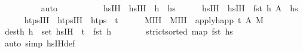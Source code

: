 \begin{isabellebody}
\ \ \ \ \ \ \ \ \isamarkupfalse%
\ auto\isanewline
\ \ \ \ \isamarkupfalse%
\isanewline
\isanewline
\ \ \ \ \isamarkupfalse%
\ hs{\isacharunderscore}{\kern0pt}IH\ \ {\isachardoublequoteopen}hs{\isacharunderscore}{\kern0pt}IH\ {\isasymequiv}\ h{}\ {\isacharhash}{\kern0pt}\ hs{}{\isachardoublequoteclose}\isanewline
\ \ \ \ \isamarkupfalse%
\ hs{\isacharprime}{\kern0pt}{\isacharunderscore}{\kern0pt}IH\ \ {\isachardoublequoteopen}hs{\isacharprime}{\kern0pt}{\isacharunderscore}{\kern0pt}IH\ {\isasymequiv}\ {\isacharparenleft}{\kern0pt}fst\ h{}{\isacharcomma}{\kern0pt}\ A{}{\isacharprime}{\kern0pt}{\isacharparenright}{\kern0pt}\ {\isacharhash}{\kern0pt}\ hs{}{\isacharprime}{\kern0pt}{\isachardoublequoteclose}\isanewline
\ \ \ \ \isamarkupfalse%
\ htps{\isacharunderscore}{\kern0pt}IH\ \ {\isachardoublequoteopen}htps{\isacharunderscore}{\kern0pt}IH\ {\isasymequiv}\ htps\ {\isacharminus}{\kern0pt}\ {\isacharbraceleft}{\kern0pt}t{\isacharbraceright}{\kern0pt}{\isachardoublequoteclose}\isanewline
\ \ \ \ \isamarkupfalse%
\ M{\isacharunderscore}{\kern0pt}IH\ \ {\isachardoublequoteopen}M{\isacharunderscore}{\kern0pt}IH\ {\isasymequiv}\ {\isacharparenleft}{\kern0pt}apply{\isacharunderscore}{\kern0pt}happ\ {\isacharparenleft}{\kern0pt}t{\isacharcomma}{\kern0pt}\ A{\isacharprime}{\kern0pt}{\isacharparenright}{\kern0pt}\ M{\isacharparenright}{\kern0pt}{\isachardoublequoteclose}\isanewline
\ \ \ \ \isamarkupfalse%
\ {\isacharbrackleft}{\kern0pt}dest{\isacharbrackright}{\kern0pt}{\isacharcolon}{\kern0pt}{\isachardoublequoteopen}{\isasymAnd}h{\isacharprime}{\kern0pt}{\isachardot}{\kern0pt}\ h{\isacharprime}{\kern0pt}\ {\isasymin}\ set\ {\isacharparenleft}{\kern0pt}hs{\isacharunderscore}{\kern0pt}IH{\isacharparenright}{\kern0pt}\ {\isasymLongrightarrow}\ t\ {\isasymnoteq}\ fst\ h{\isacharprime}{\kern0pt}{\isachardoublequoteclose}\isanewline
\ \ \ \ \ \ \isamarkupfalse%
\ {\isacartoucheopen}strict{\isacharunderscore}{\kern0pt}sorted\ {\isacharparenleft}{\kern0pt}map\ fst\ hs{\isacharparenright}{\kern0pt}{\isacartoucheclose}\isanewline
\ \ \ \ \ \ \isamarkupfalse%
\ {\isacharparenleft}{\kern0pt}auto\ simp{\isacharcolon}{\kern0pt}\ hs{\isacharunderscore}{\kern0pt}IH{\isacharunderscore}{\kern0pt}def{\isacharparenright}{\kern0pt}\isanewline
\ \ \ \ \isamarkupfalse%

\end{isabellebody}
